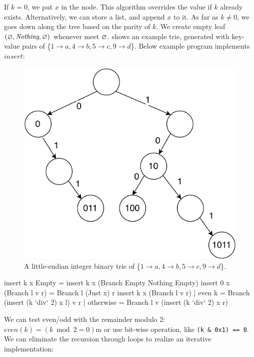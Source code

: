 \documentclass[b5paper]{article}
\begin{document}
If $k = 0$, we put $x$ in the node. This algorithm overrides the value if $k$ already exists. Alternatively, we can store a list, and append $x$ to it. As far as $k \neq 0$, we goes down along the tree based on the parity of $k$. We create empty leaf $(\varnothing, \textit{Nothing}, \varnothing)$ whenever meet $\varnothing$.  shows an example trie, generated with key-value pairs of \{$ 1 \rightarrow a, 4 \rightarrow b, 5 \rightarrow c, 9 \rightarrow d$\}. Below example program implements $insert$:

\begin{figure}[htbp]
  \centering
  \includegraphics[scale=0.6, page=3]{img/trie}
  \caption{A little-endian integer binary trie of
          \{$ 1 \rightarrow a, 4 \rightarrow b, 5 \rightarrow c, 9 \rightarrow d$\}.}
  \label{fig:int-trie}
\end{figure}

\begin{Haskell}
insert k x Empty = insert k x (Branch Empty Nothing Empty)
insert 0 x (Branch l v r) = Branch l (Just x) r
insert k x (Branch l v r) | even k    = Branch (insert (k `div` 2) x l) v r
                          | otherwise = Branch l v (insert (k `div` 2) x r)
\end{Haskell}

We can test even/odd with the remainder modulo 2: $even(k) = (k \bmod 2 = 0)$m or use bit-wise operation, like \texttt{(k \& 0x1) == 0}. We can eliminate the recursion through loops to realize an iterative implementation:
\end{document}
